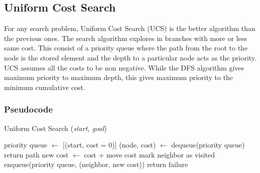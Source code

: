 \subsection{Uniform Cost Search}
\noindent For any search problem, Uniform Cost Search (UCS) is the better algorithm than the previous ones. The search algorithm explores in branches with more or less same cost. This consist of a priority queue where the path from the root to the node is the stored element and the depth to a particular node acts as the priority. UCS assumes all the costs to be non negative. While the DFS algorithm gives maximum priority to maximum depth, this gives maximum priority to the minimum cumulative cost.

\subsubsection{Pseudocode}
\begin{algorithm}[H]
	\caption{Uniform Cost Search (\textit{start, goal})}
	\label{alg:ucs}
	\begin{algorithmic}[1]
	\State priority queue \(\gets\) [(start, cost = 0)]
		\State (node, cost) \(\gets\) dequeue(priority queue)
			\State return path
		\EndIf
			\State new cost \(\gets\) cost + move cost
				\State mark neighbor as visited
				\State enqueue(priority queue, (neighbor, new cost))
			\EndIf
		\EndFor
	\EndWhile
	\State return failure
	\end{algorithmic}
\end{algorithm}

